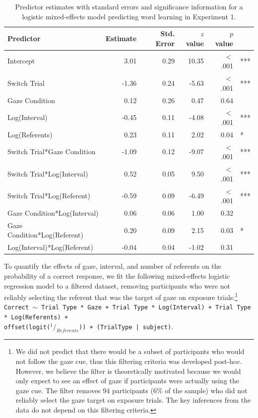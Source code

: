 \documentclass[authoryear, review]{elsarticle}
\begin{document}
\begin{table}[tb]
\centering
\begin{tabular}{lrrrrl}
 Predictor & Estimate & Std. Error & $z$ value & $p$ value &  \\ 
  \hline
Intercept & 3.01 & 0.29 & 10.35 & $<$ .001 & *** \\ 
  Switch Trial & -1.36 & 0.24 & -5.63 & $<$ .001 & *** \\ 
  Gaze Condition & 0.12 & 0.26 & 0.47 & 0.64 &  \\ 
  Log(Interval) & -0.45 & 0.11 & -4.08 & $<$ .001 & *** \\ 
  Log(Referents) & 0.23 & 0.11 & 2.02 & 0.04 & * \\ 
  Switch Trial*Gaze Condition & -1.09 & 0.12 & -9.07 & $<$ .001 & *** \\ 
  Switch Trial*Log(Interval) & 0.52 & 0.05 & 9.50 & $<$ .001 & *** \\ 
  Switch Trial*Log(Referent) & -0.59 & 0.09 & -6.49 & $<$ .001 & *** \\ 
  Gaze Condition*Log(Interval) & 0.06 & 0.06 & 1.00 & 0.32 &  \\ 
  Gaze Condition*Log(Referent) & 0.20 & 0.09 & 2.15 & 0.03 & * \\ 
  Log(Interval)*Log(Referent) & -0.04 & 0.04 & -1.02 & 0.31 &  \\ 
   \hline
\end{tabular}
\caption{Predictor estimates with standard errors and significance information for a logistic mixed-effects model predicting word learning in Experiment 1.} 
\label{tab:exp1_reg}
\end{table}

To quantify the effects of gaze, interval, and number of referents on
the probability of a correct response, we fit the following
mixed-effects logistic regression model to a filtered dataset, removing
participants who were not reliably selecting the referent that was the
target of gaze on exposure trials:\footnote{We did not predict that
  there would be a subset of participants who would not follow the gaze
  cue, thus this filtering criteria was developed post-hoc. However, we
  believe the filter is theoretically motivated because we would only
  expect to see an effect of gaze if participants were actually using
  the gaze cue. The filter removes 94 participants (6\% of the sample)
  who did not reliably select the gaze target on exposure trials. The
  key inferences from the data do not depend on this filtering criteria.}
\texttt{Correct $\sim$ Trial Type * Gaze + Trial Type * Log(Interval) + Trial Type * Log(Referents) + \\ offset(logit($^1/_{Referents}$)) + (TrialType | subject)}.
\end{document}
